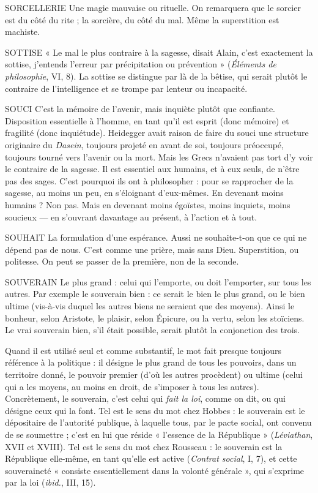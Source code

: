 SORCELLERIE Une magie mauvaise ou rituelle. On remarquera que le sorcier
est du côté du rite ; la sorcière, du côté du mal. Même
la superstition est machiste.

SOTTISE  « Le mal le plus contraire à la sagesse, disait Alain, c’est exactement
la sottise, j'entends l’erreur par précipitation ou prévention » ({\it Éléments
de philosophie}, VI, 8). La sottise se distingue par là de la bêtise, qui serait
plutôt le contraire de l'intelligence et se trompe par lenteur ou incapacité.

SOUCI C’est la mémoire de l’avenir, mais inquiète plutôt que confiante.
Disposition essentielle à l’homme, en tant qu’il est esprit (donc
mémoire) et fragilité (donc inquiétude). Heidegger avait raison de faire du
souci une structure originaire du {\it Dasein}, toujours projeté en avant de soi, toujours
préoccupé, toujours tourné vers l’avenir ou la mort. Mais les Grecs
n'avaient pas tort d’y voir le contraire de la sagesse. Il est essentiel aux humains,
et à eux seuls, de n’être pas des sages. C’est pourquoi ils ont à philosopher : pour
se rapprocher de la sagesse, au moins un peu, en s’éloignant d’eux-mêmes. En
devenant moins humains ? Non pas. Mais en devenant moins égoïstes, moins
inquiets, moins soucieux — en s’ouvrant davantage au présent, à l’action et à tout.

SOUHAIT La formulation d’une espérance. Aussi ne souhaite-t-on que ce
qui ne dépend pas de nous. C’est comme une prière, mais sans
Dieu. Superstition, ou politesse. On peut se passer de la première, non de la
seconde.

SOUVERAIN Le plus grand : celui qui l'emporte, ou doit l'emporter, sur
tous les autres. Par exemple le souverain bien : ce serait le bien
le plus grand, ou le bien ultime (vis-à-vis duquel les autres biens ne seraient que
des moyens). Ainsi le bonheur, selon Aristote, le plaisir, selon Épicure, ou la
vertu, selon les stoïciens. Le vrai souverain bien, s’il était possible, serait plutôt
la conjonction des trois.

Quand il est utilisé seul et comme substantif, le mot fait presque toujours
référence à la politique : il désigne le plus grand de tous les pouvoirs, dans un
territoire donné, le pouvoir premier (d’où les autres procèdent) ou ultime (celui
qui a les moyens, au moins en droit, de s’imposer à tous les autres). Concrètement,
le souverain, c’est celui qui {\it fait la loi}, comme on dit, ou qui désigne ceux
qui la font. Tel est le sens du mot chez Hobbes : le souverain est le dépositaire
de l’autorité publique, à laquelle tous, par le pacte social, ont convenu de se
soumettre ; c’est en lui que réside « l'essence de la République » ({\it Léviathan},
XVII et XVIII). Tel est le sens du mot chez Rousseau : le souverain est la République
elle-même, en tant qu’elle est active ({\it Contrat social}, I, 7), et cette souveraineté
« consiste essentiellement dans la volonté générale », qui s'exprime par
la loi ({\it ibid.}, III, 15).

